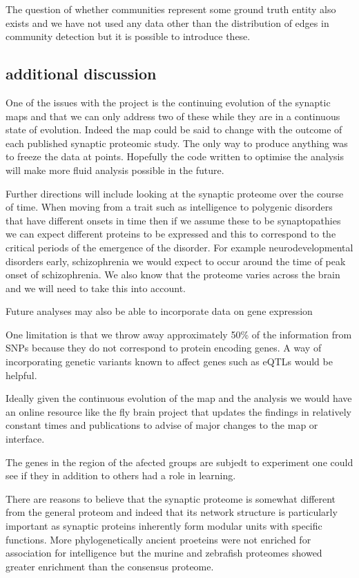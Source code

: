 The question of whether communities represent some ground truth entity also exists \cite{peel2017ground}  and we have not used any data other than the distribution of edges in community detection but it is possible to introduce these.  \cite{newman2016structure} 



\subsection{additional discussion}

One of the issues with the project is the continuing evolution of the synaptic maps and that we can only address two of these while they are in a continuous state of evolution. Indeed the map could be said to change with the outcome of each published synaptic proteomic study. The only way to produce anything was to freeze the data at points. Hopefully the code written to optimise the analysis will make more fluid analysis possible in the future.

Further directions will include looking at the synaptic proteome over the course of time. When moving from a trait such as intelligence to polygenic disorders that have different onsets in time then if we assume these to be synaptopathies we can expect different proteins to be expressed and this to correspond to the critical periods of the emergence of the disorder. For example neurodevelopmental disorders early, schizophrenia we would expect to occur around the time of peak onset of schizophrenia. We also know that the proteome varies across the brain and we will need to take this into account.

Future analyses may also be able to incorporate data on gene expression

One limitation is that we throw away approximately 50\% of the information from SNPs because they do not correspond to protein encoding genes. A way of incorporating genetic variants known to affect genes such as eQTLs would be helpful. 

Ideally given the continuous evolution of the map and the analysis we would have an online resource like the fly brain project that updates the findings in relatively constant times and publications to advise of major changes to the map or interface. 

The genes in the region of the afected groups are subjedt to experiment one could see if they in addition to others had a role in learning.

There are reasons to believe that the synaptic proteome is somewhat different from the general proteom and indeed that its network structure is particularly important as synaptic proteins inherently form modular units with specific functions. More phylogenetically ancient proeteins were not enriched for association for intelligence but the murine and zebrafish proteomes showed greater enrichment than the consensus proteome.

